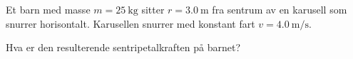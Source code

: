 %
Et barn med masse $m = \SI{25}{\kilo\gram}$ sitter $r = \SI{3.0}{\metre}$ fra sentrum av en karusell som snurrer horisontalt. Karusellen snurrer med konstant fart $v = \SI{4.0}{\metre\per\second}$.

Hva er den resulterende sentripetalkraften på barnet?
